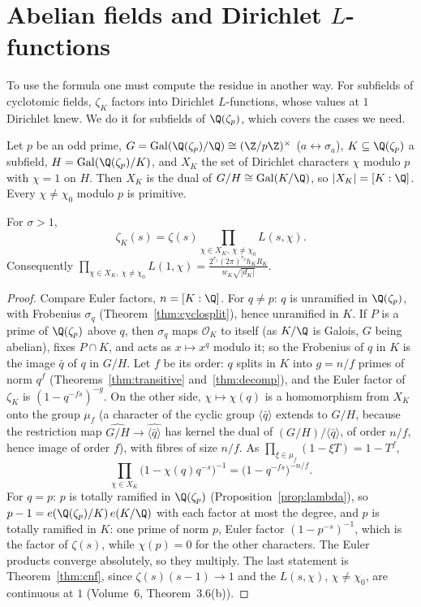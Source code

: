 \section{Abelian fields and Dirichlet \texorpdfstring{$L$}{L}-functions}

To use the formula one must compute the residue in another way. For subfields of cyclotomic fields, $\zeta_K$ factors into Dirichlet
$L$-functions, whose values at $1$ Dirichlet knew. We do it for subfields of $\Q(\zeta_p)$, which covers the cases we need.

Let $p$ be an odd prime, $G=\operatorname{Gal}(\Q(\zeta_p)/\Q)\cong(\Z/p\Z)^\times$ ($a\leftrightarrow\sigma_a$), $K\subseteq\Q(\zeta_p)$ a
subfield, $H=\operatorname{Gal}(\Q(\zeta_p)/K)$, and $X_K$ the set of Dirichlet characters $\chi$ modulo $p$ with $\chi=1$ on $H$. Then
$X_K$ is the dual of $G/H\cong\operatorname{Gal}(K/\Q)$, so $|X_K|=[K:\Q]$. Every $\chi\ne\chi_0$ modulo $p$ is primitive.

\begin{theorem}\label{thm:zetaab}
For $\sigma>1$,
\[
\zeta_K(s)=\zeta(s)\prod_{\chi\in X_K,\ \chi\ne\chi_0}L(s,\chi).
\]
Consequently $\displaystyle\prod_{\chi\in X_K,\ \chi\ne\chi_0}L(1,\chi)=\frac{2^{r_1}(2\pi)^{r_2}h_KR_K}{w_K\sqrt{|d_K|}}$.
\end{theorem}
\begin{proof}
Compare Euler factors, $n=[K:\Q]$. For $q\ne p$: $q$ is unramified in $\Q(\zeta_p)$, with Frobenius $\sigma_q$ (Theorem~\ref{thm:cyclosplit}),
hence unramified in $K$. If $P$ is a prime of $\Q(\zeta_p)$ above $q$, then $\sigma_q$ maps $\mathcal O_K$ to itself (as $K/\Q$ is Galois,
$G$ being abelian), fixes $P\cap K$, and acts as $x\mapsto x^q$ modulo it; so the Frobenius of $q$ in $K$ is the image $\bar q$ of $q$
in $G/H$. Let $f$ be its order: $q$ splits in $K$ into $g=n/f$ primes of norm $q^f$ (Theorems~\ref{thm:transitive} and~\ref{thm:decomp}),
and the Euler factor of $\zeta_K$ is $(1-q^{-fs})^{-g}$. On the other side, $\chi\mapsto\chi(q)$ is a homomorphism from $X_K$ onto
the group $\mu_f$ (a character of the cyclic group $\langle\bar q\rangle$ extends to $G/H$, because the restriction map
$\widehat{G/H}\to\widehat{\langle\bar q\rangle}$ has kernel the dual of $(G/H)/\langle\bar q\rangle$, of order $n/f$, hence image of order
$f$), with fibres of size $n/f$. As $\prod_{\xi\in\mu_f}(1-\xi T)=1-T^f$,
\[
\prod_{\chi\in X_K}\bigl(1-\chi(q)q^{-s}\bigr)^{-1}=\bigl(1-q^{-fs}\bigr)^{-n/f}.
\]
For $q=p$: $p$ is totally ramified in $\Q(\zeta_p)$ (Proposition~\ref{prop:lambda}), so $p-1=e(\Q(\zeta_p)/K)\,e(K/\Q)$ with each factor at
most the degree, and $p$ is totally ramified in $K$: one prime of norm $p$, Euler factor $(1-p^{-s})^{-1}$, which is the factor of
$\zeta(s)$, while $\chi(p)=0$ for the other characters. The Euler products converge absolutely, so they multiply. The last statement
is Theorem~\ref{thm:cnf}, since $\zeta(s)(s-1)\to1$ and the $L(s,\chi)$, $\chi\ne\chi_0$, are continuous at $1$ (Volume~6,
Theorem~3.6(b)).
\end{proof}

